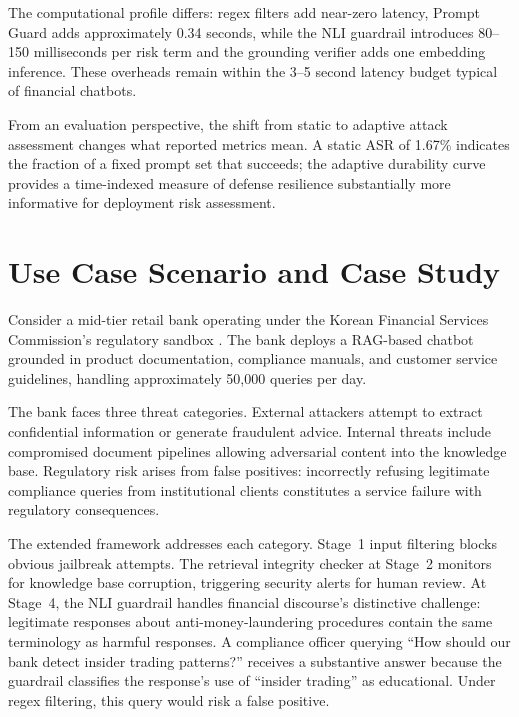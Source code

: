 The computational profile differs: regex filters add near-zero latency, Prompt Guard adds approximately 0.34 seconds, while the NLI guardrail introduces 80--150 milliseconds per risk term and the grounding verifier adds one embedding inference. These overheads remain within the 3--5 second latency budget typical of financial chatbots.

From an evaluation perspective, the shift from static to adaptive attack assessment changes what reported metrics mean. A static ASR of 1.67\% indicates the fraction of a fixed prompt set that succeeds; the adaptive durability curve provides a time-indexed measure of defense resilience substantially more informative for deployment risk assessment.

\section{Use Case Scenario and Case Study}

Consider a mid-tier retail bank operating under the Korean Financial Services Commission's regulatory sandbox \cite{fsc2025regulatory}. The bank deploys a RAG-based chatbot grounded in product documentation, compliance manuals, and customer service guidelines, handling approximately 50,000 queries per day.

The bank faces three threat categories. External attackers attempt to extract confidential information or generate fraudulent advice. Internal threats include compromised document pipelines allowing adversarial content into the knowledge base. Regulatory risk arises from false positives: incorrectly refusing legitimate compliance queries from institutional clients constitutes a service failure with regulatory consequences.

The extended framework addresses each category. Stage~1 input filtering blocks obvious jailbreak attempts. The retrieval integrity checker at Stage~2 monitors for knowledge base corruption, triggering security alerts for human review. At Stage~4, the NLI guardrail handles financial discourse's distinctive challenge: legitimate responses about anti-money-laundering procedures contain the same terminology as harmful responses. A compliance officer querying ``How should our bank detect insider trading patterns?'' receives a substantive answer because the guardrail classifies the response's use of ``insider trading'' as educational. Under regex filtering, this query would risk a false positive.

